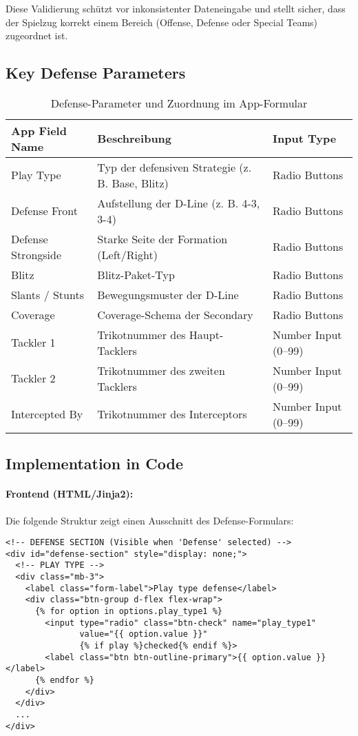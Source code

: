 \documentclass[12pt]{article}
\begin{document}
Diese Validierung schützt vor inkonsistenter Dateneingabe und stellt sicher, dass der Spielzug korrekt einem Bereich (Offense, Defense oder Special Teams) zugeordnet ist.

\subsection{Key Defense Parameters}

\begin{table}[H]
\centering
\begin{tabular}{|l|p{6cm}|l|}
\hline
\textbf{App Field Name} & \textbf{Beschreibung} & \textbf{Input Type} \\
\hline
Play Type          & Typ der defensiven Strategie (z. B. Base, Blitz) & Radio Buttons \\
Defense Front      & Aufstellung der D-Line (z. B. 4-3, 3-4) & Radio Buttons \\
Defense Strongside & Starke Seite der Formation (Left/Right) & Radio Buttons \\
Blitz              & Blitz-Paket-Typ & Radio Buttons \\
Slants / Stunts    & Bewegungsmuster der D-Line & Radio Buttons \\
Coverage           & Coverage-Schema der Secondary & Radio Buttons \\
Tackler 1          & Trikotnummer des Haupt-Tacklers & Number Input (0–99) \\
Tackler 2          & Trikotnummer des zweiten Tacklers & Number Input (0–99) \\
Intercepted By     & Trikotnummer des Interceptors & Number Input (0–99) \\
\hline
\end{tabular}
\caption{Defense-Parameter und Zuordnung im App-Formular}
\end{table}


\subsection{Implementation in Code}

\paragraph{Frontend (HTML/Jinja2):} Die folgende Struktur zeigt einen Ausschnitt des Defense-Formulars:

\begin{verbatim}
<!-- DEFENSE SECTION (Visible when 'Defense' selected) -->
<div id="defense-section" style="display: none;">
  <!-- PLAY TYPE -->
  <div class="mb-3">
    <label class="form-label">Play type defense</label>
    <div class="btn-group d-flex flex-wrap">
      {% for option in options.play_type1 %}
        <input type="radio" class="btn-check" name="play_type1"
               value="{{ option.value }}"
               {% if play %}checked{% endif %}>
        <label class="btn btn-outline-primary">{{ option.value }}</label>
      {% endfor %}
    </div>
  </div>
  ...
</div>
\end{verbatim}
\end{document}
